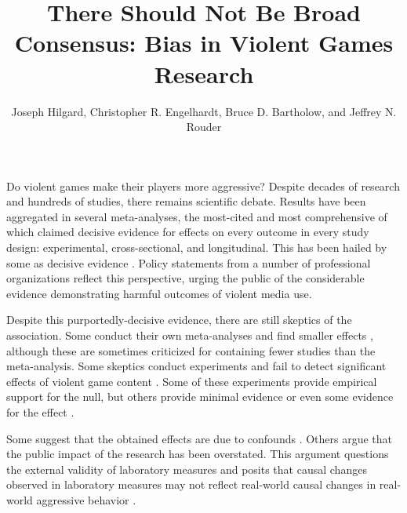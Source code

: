 \documentclass[man]{apa6}
\author{Joseph Hilgard, Christopher R. Engelhardt, Bruce D. Bartholow, and Jeffrey N. Rouder}
\title{There Should Not Be Broad Consensus: Bias in Violent Games Research}
\affiliation{University of Missouri}
\begin{document}
\maketitle

Do violent games make their players more aggressive? Despite decades of research and hundreds of studies, there remains scientific debate. Results have been aggregated in several meta-analyses, the most-cited and most comprehensive of which \citep{Anderson:etal:2010} claimed decisive evidence for effects on every outcome in every study design: experimental, cross-sectional, and longitudinal. 
This has been hailed by some as decisive evidence \citep{Bushman:etal:2010,Huesmann:2010,Huesmann:2014}. 
Policy statements from a number of professional organizations \citep[e.g.,][]{AAP:2009} reflect this perspective, urging the public of the considerable evidence demonstrating harmful outcomes of violent media use.


Despite this purportedly-decisive evidence, there are still skeptics of the association.
Some conduct their own meta-analyses and find smaller effects \citep{Ferguson:2007a,Ferguson:2007b,Ferguson:InPress,Sherry:2001}, although these are sometimes criticized for containing fewer studies than the \citet{Anderson:etal:2010} meta-analysis. %
Some skeptics conduct experiments and fail to detect significant effects of violent game content \citep{Adachi:Willoughby:2011,Elson:etal:2013,Ferguson:etal:2008,Valadez:Ferguson:2012}. Some of these experiments provide empirical support for the null, but others provide minimal evidence or even some evidence for the effect \citep{Hilgard:etal:2014}.

Some suggest that the obtained effects are due to confounds \citep{Adachi:Willoughby:2011b;Elson:etal:2013}. Others argue that the public impact of the research has been overstated. This argument questions the external validity of laboratory measures and posits that causal changes observed in laboratory measures may not reflect real-world causal changes in real-world aggressive behavior \citep{Elson:Ferguson:2014}. %
\end{document}
